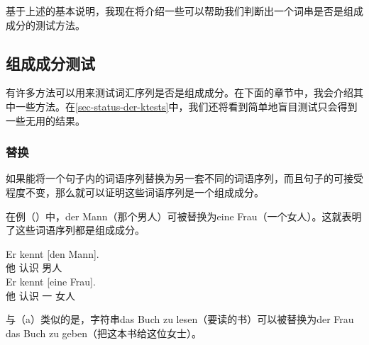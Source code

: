 基于上述的基本说明，我现在将介绍一些可以帮助我们判断出一个词串是否是组成成分的测试方法。


\subsection{组成成分测试}
有许多方法可以用来测试词汇序列是否是组成成分。在下面的章节中，我会介绍其中一些方法。在\ref{sec-status-der-ktests}中，我们还将看到简单地盲目测试只会得到一些无用的结果。

\subsubsection{替换}
如果能将一个句子内的词语序列替换为另一套不同的词语序列，而且句子的可接受程度不变，那么就可以证明这些词语序列是一个组成成分。

在例（）中，der Mann（那个男人）可被替换为eine Frau（一个女人）。这就表明了这些词语序列都是组成成分。

\eal
\ex 
\gll Er kennt [den Mann].\\
     他 认识 \spacebr{} 男人\\
\ex 
\gll Er kennt [eine Frau].\\
     他 认识 \spacebr{}一 女人\\
\zl

\noindent
与（a）类似的是，字符串das Buch zu lesen（要读的书）可以被替换为der Frau das Buch zu geben（把这本书给这位女士）。


